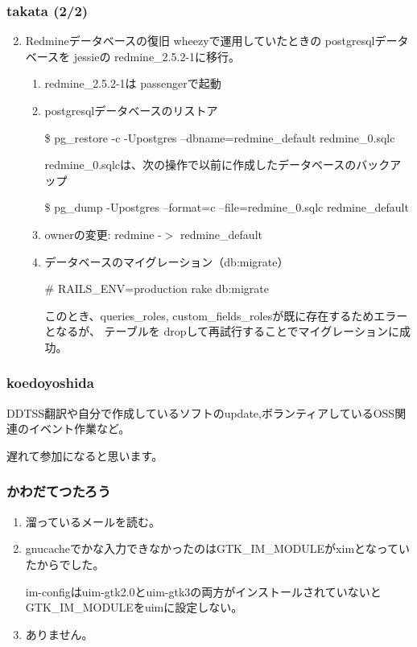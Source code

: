 \documentclass[cjk,dvipdfmx,10pt,compress,%
hyperref={bookmarks=true,bookmarksnumbered=true,bookmarksopen=false,%
colorlinks=false,%
pdftitle={第 87 回 関西 Debian 勉強会},%
pdfauthor={倉敷・のがた・佐々木・かわだ・八津尾},%
pdfsubject={資料},%
}]{beamer}
\begin{document}
\begin{frame}
  \frametitle{ takata (2/2)}
  \begin{enumerate}
    \setcounter{enumi}{1}
  \item Redmineデータベースの復旧
    wheezyで運用していたときの postgresqlデータベースを jessieの redmine\_{}2.5.2-1に移行。
    \begin{enumerate}
    \item redmine\_{}2.5.2-1は passengerで起動
    \item postgresqlデータベースのリストア

      \begin{block}{}
        \${} pg\_{}restore -c -Upostgres --dbname=redmine\_{}default redmine\_{}0.sqlc
      \end{block}
      redmine\_{}0.sqlcは、次の操作で以前に作成したデータベースのバックアップ
      \begin{block}{}
        \${} pg\_{}dump -Upostgres --format=c --file=redmine\_{}0.sqlc redmine\_{}default
      \end{block}
    \item ownerの変更: redmine -$>$ redmine\_{}default
    \item データベースのマイグレーション（db:migrate）
      \begin{block}{}
        \# RAILS\_{}ENV=production rake db:migrate
      \end{block}
      このとき、queries\_{}roles, custom\_{}fields\_{}rolesが既に存在するためエラーとなるが、
      テーブルを dropして再試行することでマイグレーションに成功。
    \end{enumerate}
  \end{enumerate}
\end{frame}

\begin{frame}
  \frametitle{ koedoyoshida }
  DDTSS翻訳や自分で作成しているソフトのupdate,ボランティアしているOSS関連のイベント作業など。

  遅れて参加になると思います。
\end{frame}

\begin{frame}
  \frametitle{ かわだてつたろう }
  \begin{enumerate}
  \item 溜っているメールを読む。
  \item gnucacheでかな入力できなかったのはGTK\_{}IM\_{}MODULEがximとなっていたからでした。

    im-configはuim-gtk2.0とuim-gtk3の両方がインストールされていないとGTK\_{}IM\_{}MODULEをuimに設定しない。
  \item ありません。
  \end{enumerate}
\end{frame}
\end{document}
